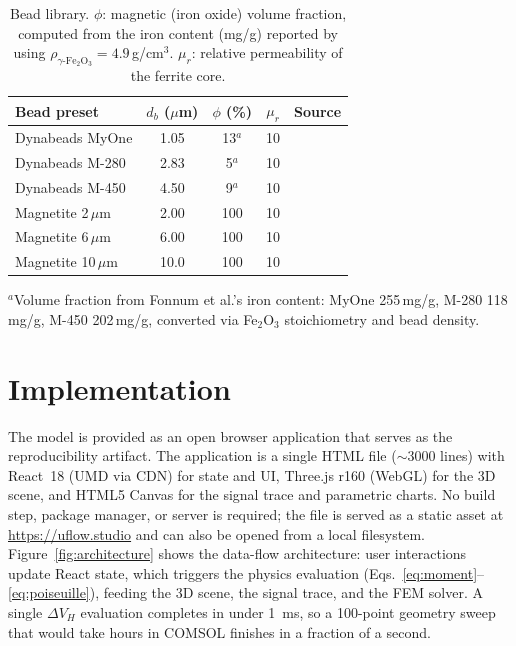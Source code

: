 \documentclass[pdflatex,sn-basic]{sn-jnl}
\theoremstyle{thmstyleone}
\theoremstyle{thmstyletwo}
\theoremstyle{thmstylethree}
\begin{document}
\begin{table}[!htbp]
\caption{Bead library. $\phi$: magnetic (iron oxide) volume fraction, computed from the iron content (mg/g) reported by \citet{fonnum2005} using $\rho_{\gamma\text{-Fe}_2\text{O}_3} = 4.9$\,g/cm$^3$. $\mu_r$: relative permeability of the ferrite core.}
\label{tab:beads}
\centering
\footnotesize
\begin{tabular}{@{}lcccc@{}}
\toprule
Bead preset & $d_b$ ($\mu$m) & $\phi$ (\%) & $\mu_r$ & Source \\
\midrule
Dynabeads MyOne & 1.05 & 13$^a$ & 10 & \citep{fonnum2005} \\
Dynabeads M-280 & 2.83 & 5$^a$ & 10 & \citep{fonnum2005} \\
Dynabeads M-450 & 4.50 & 9$^a$ & 10 & \citep{fonnum2005} \\
Magnetite 2\,$\mu$m & 2.00 & 100 & 10 & \citep{govindaraju2025} \\
Magnetite 6\,$\mu$m & 6.00 & 100 & 10 & \citep{govindaraju2025} \\
Magnetite 10\,$\mu$m & 10.0 & 100 & 10 & \citep{govindaraju2025} \\
\bottomrule
\end{tabular}
\begin{flushleft}
\footnotesize{$^a$Volume fraction from Fonnum et al.'s iron content: MyOne 255\,mg/g, M-280 118\,mg/g, M-450 202\,mg/g, converted via Fe$_2$O$_3$ stoichiometry and bead density.}
\end{flushleft}
\end{table}

\section{Implementation}\label{sec:implementation}

The model is provided as an open browser application that serves as the reproducibility artifact. The application is a single HTML file (${\sim}\num{3000}$ lines) with React~18 (UMD via CDN) for state and UI, Three.js r160 (WebGL) for the 3D scene, and HTML5 Canvas for the signal trace and parametric charts. No build step, package manager, or server is required; the file is served as a static asset at \url{https://uflow.studio} and can also be opened from a local filesystem. Figure~\ref{fig:architecture} shows the data-flow architecture: user interactions update React state, which triggers the physics evaluation (Eqs.~\eqref{eq:moment}--\eqref{eq:poiseuille}), feeding the 3D scene, the signal trace, and the FEM solver. A single $\Delta V_H$ evaluation completes in under \SI{1}{\milli\second}, so a 100-point geometry sweep that would take hours in COMSOL finishes in a fraction of a second.
\end{document}
